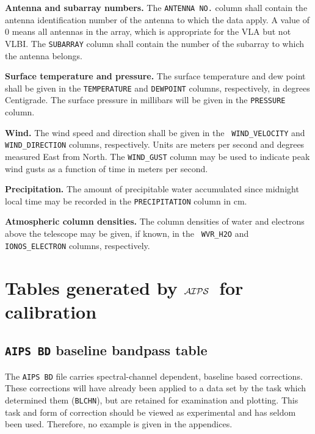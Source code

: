\documentclass[twoside]{article}
\newcommand{\Hi}[1]{\textcolor{hicol}{#1}}
\newcommand{\AIPS}{{$\cal AIPS\/$}}
\begin{document}
{\bf Antenna and subarray numbers.}  The {\tt ANTENNA NO.} column
shall contain the antenna identification number of the antenna to
which the data apply.  A value of 0 means all antennas in the array,
which is appropriate for the VLA but not VLBI\@.  The {\tt SUBARRAY}
column shall contain the number of the subarray to which the antenna
belongs.

{\bf Surface temperature and pressure.} The surface temperature and
dew point shall be given in the {\tt TEMPERATURE} and {\tt DEWPOINT}
columns, respectively, in degrees Centigrade.  The surface pressure in
millibars will be given in the {\tt PRESSURE} column.

{\bf Wind.} The wind speed and direction shall be given in the {\tt
  WIND\_VELOCITY} and {\tt WIND\_DIRECTION} columns, respectively.
Units are meters per second and degrees measured East from North.
\Hi{The {\tt WIND\_GUST} column may be used to indicate peak wind
  gusts as a function of time in meters per second.}

\Hi{{\bf Precipitation.} The amount of precipitable water accumulated
  since midnight local time may be recorded in the {\tt PRECIPITATION}
  column in cm.}

{\bf Atmospheric column densities.} The column densities of water and
electrons above the telescope \Hi{may} be given, if known, in the {\tt
  WVR\_H2O} and {\tt IONOS\_ELECTRON} columns, respectively.

\section{Tables generated by \AIPS\ for calibration}
\label{s:calibration}

\subsection{{\tt AIPS BD} baseline bandpass table}
\label{s:BD}

The {\tt AIPS BD} file carries spectral-channel dependent, baseline
based corrections.  These corrections will have already been applied
to a data set by the task which determined them ({\tt BLCHN}), but are
retained for examination and plotting.  This task and form of
correction should be viewed as experimental and has seldom been used.
Therefore, no example is given in the appendices.
\end{document}
